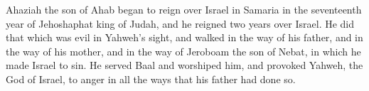 \begin{paracol}{2}
\begin{otherlanguage}{english}
 Ahaziah the son of Ahab began to reign over Israel in
Samaria in the seventeenth year of Jehoshaphat king of Judah, and he
reigned two years over Israel.  He did that which was
evil in Yahweh's sight, and walked in the way of his father, and in the
way of his mother, and in the way of Jeroboam the son of Nebat, in which
he made Israel to sin.  He served Baal and worshiped him,
and provoked Yahweh, the God of Israel, to anger in all the ways that
his father had done so. \end{otherlanguage}
\end{paracol}

